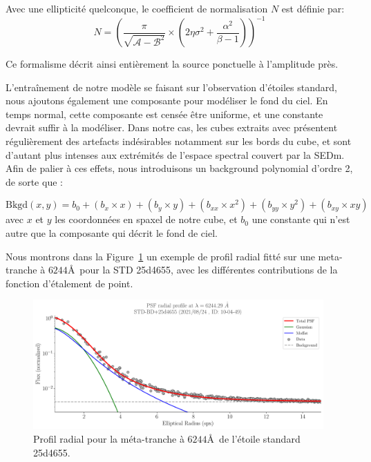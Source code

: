 \documentclass[../main/main.tex]{subfiles}
\begin{document}
Avec une ellipticité quelconque, le coefficient de
normalisation $N$ est définie par:
\begin{equation}
  \label{eq:normgaussmoff}
  N = \left(
    \frac{\pi}{\sqrt{\mathcal{A}-\mathcal{B}^{2}}}\times\left(
      2\eta\sigma^{2}+\frac{\alpha^{2}}{\beta -1}\right) \right)^{-1}
\end{equation}

Ce formalisme décrit ainsi entièrement la source ponctuelle à
l'amplitude près.

L'entraînement de notre modèle se faisant sur l'observation d'étoiles
standard, nous ajoutons également une composante pour modéliser le fond du
ciel. En temps normal, cette composante est censée être uniforme,
et une constante devrait suffir à la modéliser. Dans notre cas, les
cubes extraits avec  \citep{pysedm} présentent régulièrement
des artefacts indésirables notamment sur les bords du cube, et sont
d'autant plus intenses aux extrémités de l'espace spectral couvert par
la SEDm. Afin de palier à ces effets, nous introduisons un background
polynomial d'ordre 2, de sorte que :

\begin{equation}
  \label{eq:backgroundcurved}
  \text{Bkgd}(x,y) = b_{0} + (b_{x}\times x)+(b_{y}\times y) + (b_{xx}\times x^{2})+ (b_{yy}\times y^{2})+(b_{xy}\times xy)
\end{equation}
avec $x$ et $y$ les coordonnées en spaxel de notre cube, et $b_{0}$ une
constante qui n'est autre que la composante qui décrit le fond de ciel.

Nous montrons dans la Figure~\ref{fig:radialprofile} un exemple de
profil radial fitté sur une meta-tranche à $6244$\AA\ pour la STD
25d4655, avec les différentes contributions de la fonction
d'étalement de point.
\begin{figure}[ht]
  \centering
  \includegraphics[width=0.99\textwidth]{../figures/06_irf/psfprofile.pdf}
  \caption[Exemple de profil radial d'un étoile standard]{Profil radial
    pour la méta-tranche à $6244$\AA\ de l'étoile standard 25d4655.}
  \label{fig:radialprofile}
\end{figure}
\end{document}
